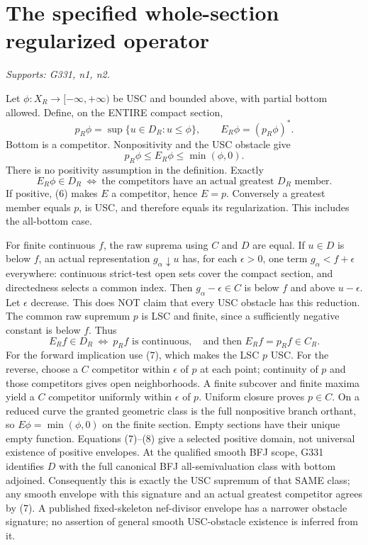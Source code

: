 \section{The specified whole-section regularized operator}
\textit{Supports: G331, n1, n2.}

Let $\phi:X_R\to[-\infty,+\infty)$ be USC and bounded above, with partial bottom allowed. Define, on the ENTIRE compact section,
\[
p_R\phi=\sup\{u\in D_R:u\le\phi\},\qquad E_R\phi=(p_R\phi)^*.
\]
Bottom is a competitor. Nonpositivity and the USC obstacle give
\[
p_R\phi\le E_R\phi\le\min(\phi,0).                    \tag{6}
\]
There is no positivity assumption in the definition. Exactly
\[
E_R\phi\in D_R\ \Longleftrightarrow\ \text{the competitors have an actual greatest }D_R\text{ member}. \tag{7}
\]
If positive, (6) makes $E$ a competitor, hence $E=p$. Conversely a greatest member equals $p$, is USC, and therefore equals its regularization. This includes the all-bottom case.

For finite continuous $f$, the raw suprema using $C$ and $D$ are equal. If $u\in D$ is below $f$, an actual representation $g_\alpha\downarrow u$ has, for each $\epsilon>0$, one term $g_\alpha<f+\epsilon$ everywhere: continuous strict-test open sets cover the compact section, and directedness selects a common index. Then $g_\alpha-\epsilon\in C$ is below $f$ and above $u-\epsilon$. Let $\epsilon$ decrease. This does NOT claim that every USC obstacle has this reduction. The common raw supremum $p$ is LSC and finite, since a sufficiently negative constant is below $f$. Thus
\[
E_Rf\in D_R\ \Longleftrightarrow\ p_Rf\text{ is continuous},
\quad\text{and then } E_Rf=p_Rf\in C_R.                \tag{8}
\]
For the forward implication use (7), which makes the LSC $p$ USC. For the reverse, choose a $C$ competitor within $\epsilon$ of $p$ at each point; continuity of $p$ and those competitors gives open neighborhoods. A finite subcover and finite maxima yield a $C$ competitor uniformly within $\epsilon$ of $p$. Uniform closure proves $p\in C$. On a reduced curve the granted geometric class is the full nonpositive branch orthant, so $E\phi=\min(\phi,0)$ on the finite section. Empty sections have their unique empty function. Equations (7)--(8) give a selected positive domain, not universal existence of positive envelopes. At the qualified smooth BFJ scope, G331 identifies $D$ with the full canonical BFJ all-semivaluation class with bottom adjoined. Consequently this is exactly the USC supremum of that SAME class; any smooth envelope with this signature and an actual greatest competitor agrees by (7). A published fixed-skeleton nef-divisor envelope has a narrower obstacle signature; no assertion of general smooth USC-obstacle existence is inferred from it.

